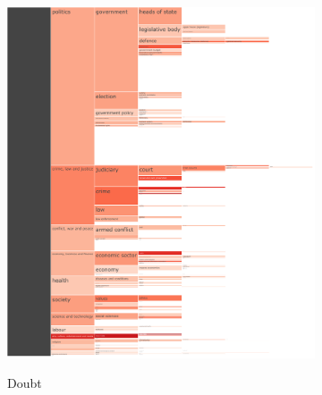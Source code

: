 \begin{figure}[!htbp]
\begin{subfigure}{0.45\textwidth}
		\href{https://martinomensio.github.io/phd-project/figures/baly_iptc_weighted_prop_tech.html#Doubt}{\includegraphics[trim={2.65cm 0cm 0cm 0cm},clip,width=\linewidth]{figures/baly_iptc_weighted_prop_tech_Doubt.pdf}}
		\caption{Doubt}
            \label{fig:baly_iptc_weighted_prop_tech_Doubt}
	\end{subfigure}
	\begin{subfigure}{0.45\textwidth}

\end{subfigure}
\end{figure}

